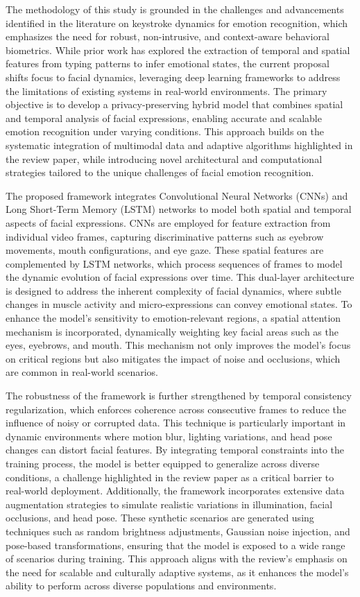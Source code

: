 \documentclass[conference]{IEEEtran}
\begin{document}
The methodology of this study is grounded in the challenges and advancements identified in the literature on keystroke dynamics for emotion recognition, which emphasizes the need for robust, non-intrusive, and context-aware behavioral biometrics. While prior work has explored the extraction of temporal and spatial features from typing patterns to infer emotional states, the current proposal shifts focus to facial dynamics, leveraging deep learning frameworks to address the limitations of existing systems in real-world environments. The primary objective is to develop a privacy-preserving hybrid model that combines spatial and temporal analysis of facial expressions, enabling accurate and scalable emotion recognition under varying conditions. This approach builds on the systematic integration of multimodal data and adaptive algorithms highlighted in the review paper, while introducing novel architectural and computational strategies tailored to the unique challenges of facial emotion recognition.  

The proposed framework integrates Convolutional Neural Networks (CNNs) and Long Short-Term Memory (LSTM) networks to model both spatial and temporal aspects of facial expressions. CNNs are employed for feature extraction from individual video frames, capturing discriminative patterns such as eyebrow movements, mouth configurations, and eye gaze. These spatial features are complemented by LSTM networks, which process sequences of frames to model the dynamic evolution of facial expressions over time. This dual-layer architecture is designed to address the inherent complexity of facial dynamics, where subtle changes in muscle activity and micro-expressions can convey emotional states. To enhance the model's sensitivity to emotion-relevant regions, a spatial attention mechanism is incorporated, dynamically weighting key facial areas such as the eyes, eyebrows, and mouth. This mechanism not only improves the model's focus on critical regions but also mitigates the impact of noise and occlusions, which are common in real-world scenarios.  

The robustness of the framework is further strengthened by temporal consistency regularization, which enforces coherence across consecutive frames to reduce the influence of noisy or corrupted data. This technique is particularly important in dynamic environments where motion blur, lighting variations, and head pose changes can distort facial features. By integrating temporal constraints into the training process, the model is better equipped to generalize across diverse conditions, a challenge highlighted in the review paper as a critical barrier to real-world deployment. Additionally, the framework incorporates extensive data augmentation strategies to simulate realistic variations in illumination, facial occlusions, and head pose. These synthetic scenarios are generated using techniques such as random brightness adjustments, Gaussian noise injection, and pose-based transformations, ensuring that the model is exposed to a wide range of scenarios during training. This approach aligns with the review's emphasis on the need for scalable and culturally adaptive systems, as it enhances the model's ability to perform across diverse populations and environments.  
\end{document}

